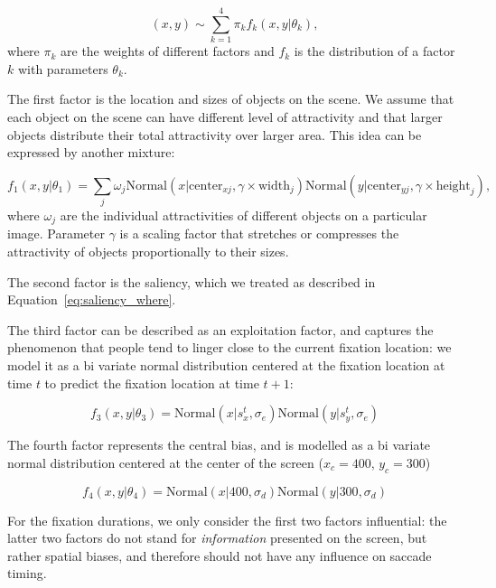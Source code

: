 \documentclass{article}
\begin{document}
\begin{equation}
    (x, y) \sim \sum_{k=1}^4 \pi_k f_k(x, y | \theta_k),
\end{equation}
where $\pi_k$ are the weights of different factors and $f_k$ is the distribution of a factor $k$ with parameters $\theta_k$.

The first factor is the location and sizes of objects on the scene. We assume that each object on the scene can have different level of attractivity and that larger objects distribute their total attractivity over larger area. This idea can be expressed by another mixture:

\begin{equation}
    f_1(x, y | \theta_1) = \sum_j \omega_j \text{Normal}(x | \text{center}_{xj}, \gamma \times \text{width}_{j}) \text{Normal}(y | \text{center}_{yj}, \gamma \times\text{height}_{j}), 
\end{equation}
where $\omega_j$ are the individual attractivities of different objects on a particular image. Parameter $\gamma$ is a scaling factor that stretches or compresses the attractivity of objects proportionally to their sizes.

The second factor is the saliency, which we treated as described in Equation~\ref{eq:saliency_where}.

The third factor can be described as an exploitation factor, and captures the phenomenon that people tend to linger close to the current fixation location: we model it as a bi variate normal distribution centered at the fixation location at time $t$ to predict the fixation location at time $t+1$:

\begin{equation}
    f_3(x, y|\theta_3) = \text{Normal}(x | s_x^t, \sigma_e) \text{Normal}(y | s_y^t, \sigma_e)
\end{equation}

The fourth factor represents the central bias, and is modelled as a bi variate normal distribution centered at the center of the screen ($x_c = 400$, $y_c = 300$)

\begin{equation}
    f_4(x, y|\theta_4) = \text{Normal}(x | 400, \sigma_d) \text{Normal}(y | 300, \sigma_d)
\end{equation}

For the fixation durations, we only consider the first two factors influential: the latter two factors do not stand for \textit{information} presented on the screen, but rather spatial biases, and therefore should not have any influence on saccade timing.
\end{document}
